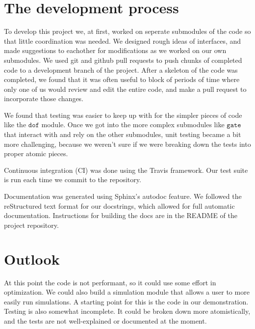 \documentclass{article}
\begin{document}
\section{The development process}
To develop this project we, at first, worked on seperate submodules of the code so that little coordination was needed. We designed rough ideas of interfaces, and made suggestions to eachother for modifications as we worked on our own submodules. We used git and github pull requests to push chunks of completed code to a development branch of the project. After a skeleton of the code was completed, we found that it was often useful to block of periods of time where only one of us would review and edit the entire code, and make a pull request to incorporate those changes.

We found that testing was easier to keep up with for the simpler pieces of code like the $\texttt{dof}$ module. Once we got into the more complex submodules like $\texttt{gate}$ that interact with and rely on the other submodules, unit testing became a bit more challenging, because we weren't sure if we were breaking down the tests into proper atomic pieces.

Continuous integration (CI) was done using the Travis framework. Our test suite is run each time we commit to the repository.

Documentation was generated using Sphinx's autodoc feature. We followed the reStructured text format for our docstrings, which allowed for full automatic documentation. Instructions for building the docs are in the README of the project repository.

\section{Outlook}
At this point the code is not performant, so it could use some effort in optimization. We could also build a simulation module that allows a user to more easily run simulations. A starting point for this is the code in our demonstration. Testing is also somewhat incomplete. It could be broken down more atomistically, and the tests are not well-explained or documented at the moment.
\end{document}
